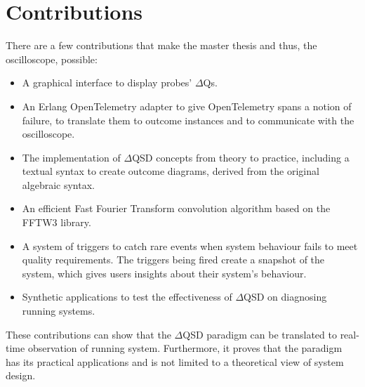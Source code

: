\section{Contributions}
    There are a few contributions that make the master thesis and thus, the oscilloscope, possible:
    \begin{itemize}
        \item A graphical interface to display probes' $\Delta$Qs.
        \item An Erlang OpenTelemetry adapter to give OpenTelemetry spans a notion of failure, to translate them to outcome instances and to communicate with the oscilloscope.
        \item The implementation of $\Delta$QSD concepts from theory to practice, including a textual syntax to create outcome diagrams, derived from the original algebraic syntax.
        \item An efficient Fast Fourier Transform convolution algorithm based on the FFTW3 library.
        \item A system of triggers to catch rare events when system behaviour fails to meet quality requirements. The triggers being fired create a snapshot of the system, which gives users insights about their system's behaviour.
        \item Synthetic applications to test the effectiveness of $\Delta$QSD on diagnosing running systems.
    \end{itemize}
    These contributions can show that the $\Delta$QSD paradigm can be translated to real-time observation of running system. Furthermore, it proves that the paradigm has its practical applications and is not limited to a theoretical view of system design.

